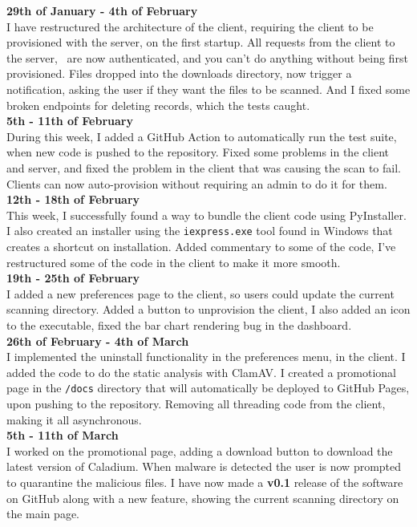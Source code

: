 \textbf{29th of January - 4th of February} \\
I have restructured the architecture of the client,
requiring the client to be provisioned with the server, on the first startup.
All requests from the client to the server, 
are now authenticated, and you can't do anything without being first provisioned.
Files dropped into the downloads directory, now trigger a notification,
asking the user if they want the files to be scanned.
And I fixed some broken endpoints for deleting records, which the tests caught. \\

\textbf{5th - 11th of February} \\
During this week, I added a GitHub Action to automatically run the test suite,
when new code is pushed to the repository.
Fixed some problems in the client and server,
and fixed the problem in the client that was causing the scan to fail.
Clients can now auto-provision without requiring an admin to do it for them. \\

\textbf{12th - 18th of February} \\
This week, I successfully found a way to bundle the client code using PyInstaller.
I also created an installer using the \texttt{iexpress.exe} tool found in Windows
that creates a shortcut on installation.
Added commentary to some of the code,
I've restructured some of the code in the client to make it more smooth. \\

\textbf{19th - 25th of February} \\
I added a new preferences page to the client,
so users could update the current scanning directory.
Added a button to unprovision the client, I also added an icon to the executable,
fixed the bar chart rendering bug in the dashboard. \\

\textbf{26th of February - 4th of March} \\
I implemented the uninstall functionality in the preferences menu, in the client.
I added the code to do the static analysis with ClamAV.
I created a promotional page in the \texttt{/docs} directory
that will automatically be deployed to GitHub Pages, upon pushing to the repository.
Removing all threading code from the client, making it all asynchronous. \\

\textbf{5th - 11th of March} \\
I worked on the promotional page, adding a download button to
download the latest version of Caladium.
When malware is detected the user is now
prompted to quarantine the malicious files.
I have now made a \textbf{v0.1} release of the software on GitHub
along with a new feature, showing the current scanning directory on the main page. \\

